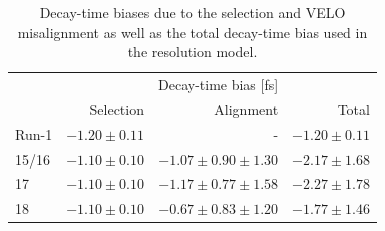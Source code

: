 \begin{table}[h]
\centering
\caption{Decay-time biases due to the selection and VELO misalignment as well as the total decay-time bias used in the resolution model. }
 \renewcommand{\arraystretch}{1.}
  \begin{tabular}{ l  r r r } 
  \hline 
  \hline
 &  &  Decay-time bias [fs]   &  \\
 & Selection & Alignment   & Total \\
  \hline			
  Run-1 &   $-1.20 \pm 0.11$ & - &  $-1.20 \pm 0.11$ \\
  15/16 &  $-1.10 \pm 0.10$ & $-1.07 \pm 0.90  \pm 1.30$ & $-2.17 \pm 1.68$   \\
  17 &   $-1.10 \pm 0.10$ & $-1.17 \pm 0.77 \pm 1.58$ & $-2.27 \pm 1.78$ \\
    18 &   $-1.10 \pm 0.10$ & $-0.67 \pm 0.83 \pm 1.20$ & $-1.77 \pm 1.46$ \\
  \hline  
 \hline   
\end{tabular}
\label{table:bias}
\end{table}

